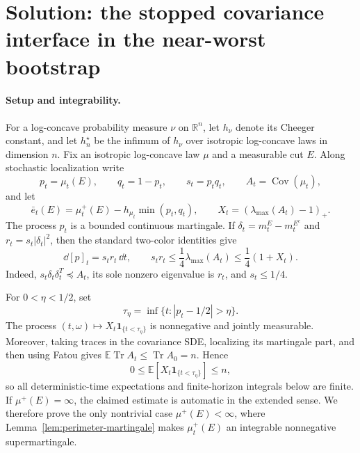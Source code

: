 \documentclass[../main.tex]{subfiles}
\begin{document}
%
\section*{Solution: the stopped covariance interface in the near-worst bootstrap}
\label{sec:sol-bootstrap-stopped-interface}

\paragraph{Setup and integrability.}
For a log-concave probability measure $\nu$ on $\mathbb R^n$, let $h_\nu$ denote its
Cheeger constant, and let $h_n^\star$ be the infimum of $h_\nu$ over isotropic
log-concave laws in dimension $n$.  Fix an isotropic log-concave law $\mu$ and a
measurable cut $E$.  Along stochastic localization write
\[
  p_t=\mu_t(E),\qquad q_t=1-p_t,\qquad s_t=p_tq_t,
  \qquad A_t=\operatorname{Cov}(\mu_t),
\]
and let
\[
  \bar e_t(E)=\mu_t^+(E)-h_{\mu_t}\min(p_t,q_t),
  \qquad X_t=(\lambda_{\max}(A_t)-1)_+.
\]
The process $p_t$ is a bounded continuous martingale.  If
$\delta_t=m_t^E-m_t^{E^c}$ and $r_t=s_t|\delta_t|^2$, then the standard two-color
identities give
\begin{equation}
  \dd[p]_t=s_tr_t\,\dd t,
  \qquad s_tr_t\leq\frac14\lambda_{\max}(A_t)
  \leq\frac14(1+X_t).
  \label{eq:sol-stopped-interface-qv}
\end{equation}
Indeed, $s_t\delta_t\delta_t^T\preceq A_t$, its sole nonzero eigenvalue is $r_t$,
and $s_t\leq1/4$.

For $0<\eta<1/2$, set
\[
  \tau_\eta=\inf\{t:|p_t-1/2|>\eta\}.
\]
The process $(t,\omega)\mapsto X_t\mathbf1_{\{t<\tau_\eta\}}$ is nonnegative and
jointly measurable.  Moreover, taking traces in the covariance SDE, localizing its
martingale part, and then using Fatou gives
$\mathbb E\operatorname{Tr}A_t\leq\operatorname{Tr}A_0=n$.  Hence
\[
  0\leq\mathbb E[X_t\mathbf1_{\{t<\tau_\eta\}}]\leq n,
\]
so all deterministic-time expectations and finite-horizon integrals below are finite.
If $\mu^+(E)=\infty$, the claimed estimate is automatic in the extended sense.  We
therefore prove the only nontrivial case $\mu^+(E)<\infty$, where
Lemma~\ref{lem:perimeter-martingale} makes $\mu_t^+(E)$ an integrable nonnegative
supermartingale.
\end{document}
